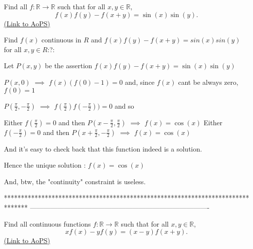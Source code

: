\begin{problem}
	Find all $ f: \mathbb{R}\to\mathbb{R}$ such that for all $x,y \in \mathbb R$,
\[ f(x)f(y) - f(x + y) = \sin(x) \sin(y).\]
	\flushright \href{https://artofproblemsolving.com/community/c6h313250}{(Link to AoPS)}
\end{problem}



\begin{solution}
	\begin{tcolorbox}Find $ f(x)$ continuous in $ R$ and
$ f(x)f(y) - f(x + y) = sin(x)sin(y)$ for all $ x,y \in R$:?:\end{tcolorbox}

Let $ P(x,y)$ be the assertion $ f(x)f(y)-f(x+y)=\sin(x)\sin(y)$

$ P(x,0)$ $ \implies$ $ f(x)(f(0)-1)=0$ and, since $ f(x)$ cant be always zero, $ f(0)=1$

$ P(\frac{\pi}2,-\frac{\pi}2)$ $ \implies$ $ f(\frac{\pi}2)f(-\frac{\pi}2))=0$ and so 

Either $ f(\frac{\pi}2)=0$ and then $ P(x-\frac{\pi}2,\frac{\pi}2)$ $ \implies$ $ f(x)=\cos(x)$ 
Either $ f(-\frac{\pi}2)=0$ and then $ P(x+\frac{\pi}2,-\frac{\pi}2)$ $ \implies$ $ f(x)=\cos(x)$ 

And it's easy to check back that this function indeed is a solution.

Hence the unique solution : $ \boxed{f(x)=\cos(x)}$

And, btw, the "continuity" constraint is useless.
\end{solution}
*******************************************************************************
-------------------------------------------------------------------------------

\begin{problem}
	Find all continuous functions $ f: \mathbb{R}\to\mathbb{R}$ such that for all $x,y \in \mathbb R$,
\[ xf(x) - yf(y) = (x - y)f(x+  y).\]
	\flushright \href{https://artofproblemsolving.com/community/c6h313264}{(Link to AoPS)}
\end{problem}



